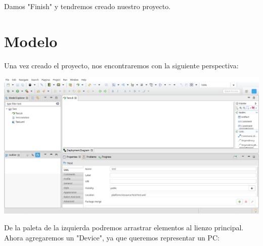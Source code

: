 \documentclass[11pt]{article}
\begin{document}
Damos "Finish" y tendremos creado nuestro proyecto.

\section{Modelo}
\label{sec:org056320f}

Una vez creado el proyecto, nos encontraremos con la siguiente
perspectiva:

\begin{center}
\includegraphics[width=.9\linewidth]{images/modelo_1.png}
\end{center}

De la paleta de la izquierda podremos arrastrar elementos al lienzo
principal. Ahora agregaremos un "Device", ya que queremos representar
un PC:
\end{document}
